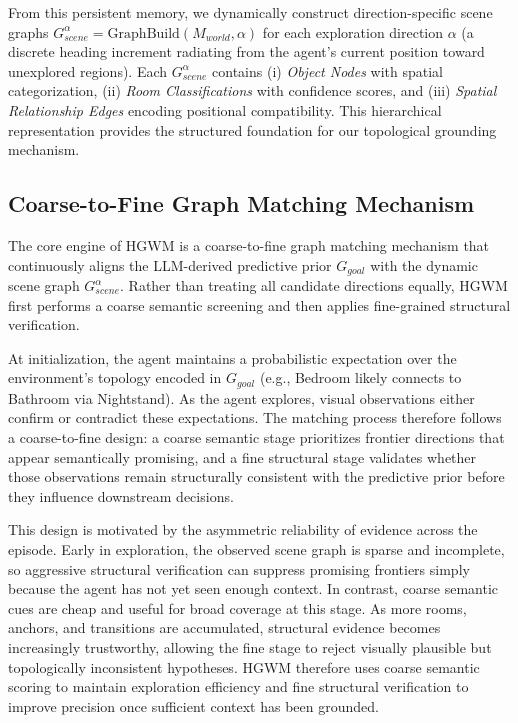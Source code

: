 \documentclass{article}
\begin{document}
From this persistent memory, we dynamically construct direction-specific scene graphs $G_{scene}^{\alpha} = \text{GraphBuild}(M_{world}, \alpha)$ for each exploration direction $\alpha$ (a discrete heading increment radiating from the agent's current position toward unexplored regions). Each $G_{scene}^{\alpha}$ contains (i) \textit{Object Nodes} with spatial categorization, (ii) \textit{Room Classifications} with confidence scores, and (iii) \textit{Spatial Relationship Edges} encoding positional compatibility. This hierarchical representation provides the structured foundation for our topological grounding mechanism.

\subsection{Coarse-to-Fine Graph Matching Mechanism}
\label{sec:grounding}

The core engine of HGWM is a coarse-to-fine graph matching mechanism that continuously aligns the LLM-derived predictive prior $G_{goal}$ with the dynamic scene graph $G_{scene}^{\alpha}$. Rather than treating all candidate directions equally, HGWM first performs a coarse semantic screening and then applies fine-grained structural verification.

At initialization, the agent maintains a probabilistic expectation over the environment's topology encoded in $G_{goal}$ (e.g., Bedroom likely connects to Bathroom via Nightstand). As the agent explores, visual observations either confirm or contradict these expectations. The matching process therefore follows a coarse-to-fine design: a coarse semantic stage prioritizes frontier directions that appear semantically promising, and a fine structural stage validates whether those observations remain structurally consistent with the predictive prior before they influence downstream decisions.

This design is motivated by the asymmetric reliability of evidence across the episode. Early in exploration, the observed scene graph is sparse and incomplete, so aggressive structural verification can suppress promising frontiers simply because the agent has not yet seen enough context. In contrast, coarse semantic cues are cheap and useful for broad coverage at this stage. As more rooms, anchors, and transitions are accumulated, structural evidence becomes increasingly trustworthy, allowing the fine stage to reject visually plausible but topologically inconsistent hypotheses. HGWM therefore uses coarse semantic scoring to maintain exploration efficiency and fine structural verification to improve precision once sufficient context has been grounded.
\end{document}
